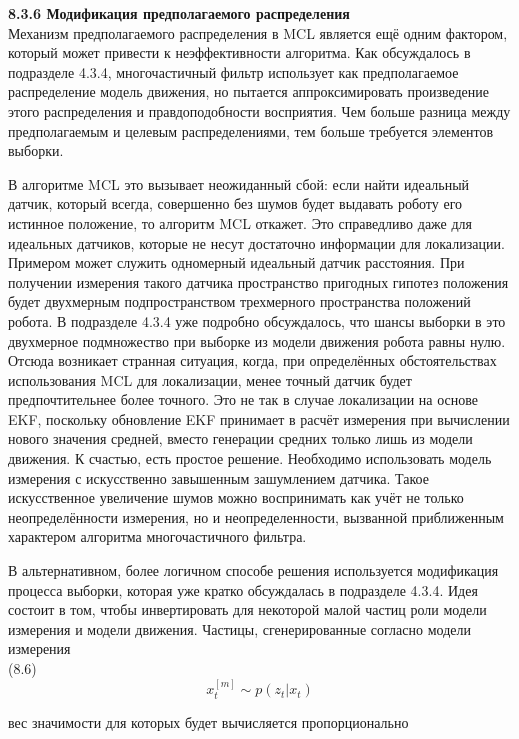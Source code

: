 \documentclass[10pt,a4paper]{article}
\begin{document}
\textbf{8.3.6	Модификация предполагаемого распределения}\\

Механизм предполагаемого распределения в MCL является ещё одним фактором, который может привести к неэффективности алгоритма. Как обсуждалось в подразделе 4.3.4, многочастичный фильтр использует как предполагаемое распределение модель движения, но пытается аппроксимировать произведение этого распределения и правдоподобности восприятия. Чем больше разница между предполагаемым и целевым распределениями, тем больше требуется элементов выборки. 

В алгоритме MCL это вызывает неожиданный сбой: если найти идеальный датчик, который всегда, совершенно без шумов будет выдавать роботу его истинное положение, то алгоритм MCL откажет. Это справедливо даже для идеальных датчиков, которые не несут достаточно информации для локализации. Примером может служить одномерный идеальный датчик расстояния. При получении измерения такого датчика пространство пригодных гипотез положения будет двухмерным подпространством трехмерного пространства положений робота. В подразделе 4.3.4 уже подробно обсуждалось, что шансы выборки в это двухмерное подмножество при выборке из модели движения робота равны нулю. Отсюда возникает странная ситуация, когда, при определённых обстоятельствах использования MCL для локализации, менее точный датчик будет предпочтительнее более точного. Это не так в случае локализации на основе EKF, поскольку обновление EKF принимает в расчёт измерения при вычислении нового значения средней, вместо генерации средних только лишь из модели движения. К счастью, есть простое решение. Необходимо использовать модель измерения с искусственно завышенным зашумлением датчика. Такое искусственное увеличение шумов можно воспринимать как учёт не только неопределённости измерения, но и неопределенности, вызванной приближенным характером алгоритма многочастичного фильтра. 

В альтернативном, более логичном способе решения используется модификация процесса выборки, которая уже кратко обсуждалась в подразделе 4.3.4. Идея состоит в том, чтобы инвертировать для некоторой малой частиц роли модели измерения и модели движения. Частицы, сгенерированные согласно модели измерения\\

(8.6)
$$x_t^{[m]}\sim p(z_t|x_t)$$

вес значимости для которых будет вычисляется пропорционально\\
\end{document}
